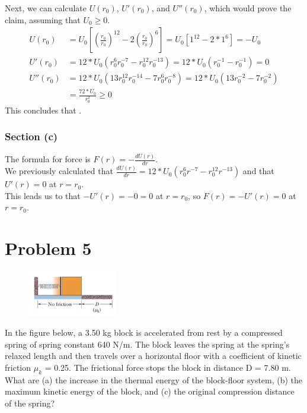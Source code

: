 \documentclass[12pt]{article}
\begin{document}
\pagebreak
Next, we can calculate $U(r_0)$, $U'(r_0)$, and $U''(r_0)$, which would prove the claim, assuming that $ U_0 \ge 0 $. 
\begin{align*}
    U(r_0)  &=  U_0\left[ \left(\frac{r_0}{r_0}\right)^{12} - 2\left(\frac{r_0}{r_0}\right)^{6} \right]
        =   U_0\left[ 1^{12} - 2*1^{6} \right] = -U_0\\
    U'(r_0) &=  12 * U_0 \left( r_0^{6}r_0^{-7} - r_0^{12} r_0^{-13} \right)
        =   12 * U_0 \left( r_0^{-1} - r_0^{-1} \right)
        =   0\\
    U''(r_0)    &=  12 * U_0 \left( 13r_0^{12} r_0^{-14} - 7r_0^{6}r_0^{-8} \right)
        =   12 * U_0 \left( 13r_0^{-2} - 7r_0^{-2} \right)\\
        &=  \frac{72*U_0}{r_0^2} 
        \ge 0
\end{align*}
This concludes that .

\subsubsection*{Section (c)}
The formula for force is $ F(r) = -\frac{dU(r)}{dr} $. \\
We previously calculated that $ \frac{dU(r)}{dr} = 12 * U_0 \left( r_0^{6}r^{-7} - r_0^{12} r^{-13} \right) $ and that $ U'(r) = 0 $ at $ r = r_0 $. \\
This leads us to that $ -U'(r) = -0 = 0 $ at $ r = r_0 $, so $ F(r) = -U'(r) = 0 $ at $ r = r_0 $.


\pagebreak
\section*{Problem 5}
\begin{figure}
    \vspace{-30pt}
    \includegraphics[width=0.35\textwidth]{graph_5.png} 
\end{figure}
In the figure below, a 3.50 kg block is accelerated from rest by a compressed spring of spring constant 640 N/m. The block leaves the spring at the spring's relaxed length and then travels over a horizontal floor with a coefficient of kinetic friction $\mu_k$ = 0.25. The frictional force stops the block in distance D = 7.80 m. What are (a) the increase in the thermal energy of the block-floor system, (b) the maximum kinetic energy of the block, and (c) the original compression distance of the spring?
\end{document}
